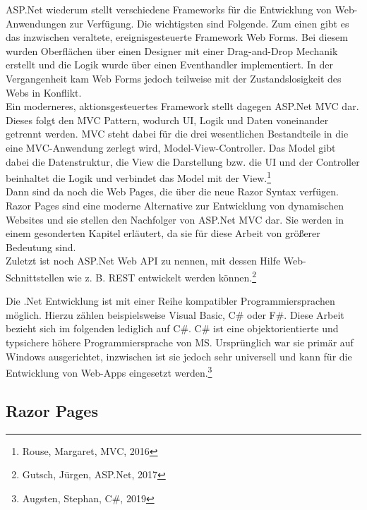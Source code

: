 \documentclass[a4paper,
12pt,
oneside]
{article}
\newcommand{\sPar}{\par\vspace*{6pt}}
\begin{document}
	ASP.Net wiederum stellt verschiedene Frameworks für die Entwicklung von Web-Anwendungen zur Verfügung. Die wichtigsten sind Folgende. Zum einen gibt es das inzwischen veraltete, ereignisgesteuerte Framework \glqq Web Forms\grqq. Bei diesem wurden Oberflächen über einen Designer mit einer Drag-and-Drop Mechanik erstellt und die Logik wurde über einen Eventhandler implementiert. In der Vergangenheit kam Web Forms jedoch teilweise mit der Zustandslosigkeit des Webs in Konflikt. \\
	Ein moderneres, aktionsgesteuertes Framework stellt dagegen ASP.Net MVC dar. Dieses folgt den MVC Pattern, wodurch UI, Logik und Daten voneinander getrennt werden. MVC steht dabei für die drei wesentlichen Bestandteile in die eine MVC-Anwendung zerlegt wird, \glqq Model-View-Controller\grqq. Das Model gibt dabei die Datenstruktur, die View die Darstellung bzw. die UI und der Controller beinhaltet die Logik und verbindet das Model mit der View.\footnote{Rouse, Margaret, MVC, 2016} \\
	Dann sind da noch die Web Pages, die über die neue Razor Syntax verfügen. Razor Pages sind eine moderne Alternative zur Entwicklung von dynamischen Websites und sie stellen den Nachfolger von ASP.Net MVC dar. Sie werden in einem gesonderten Kapitel erläutert, da sie für diese Arbeit von größerer Bedeutung sind. \\
	Zuletzt ist noch ASP.Net Web API zu nennen, mit dessen Hilfe Web-Schnittstellen wie z. B. REST entwickelt werden können.\footnote{Gutsch, Jürgen, ASP.Net, 2017} \sPar
	Die .Net Entwicklung ist mit einer Reihe kompatibler Programmiersprachen möglich. Hierzu zählen beispielsweise Visual Basic, C\# oder F\#. Diese Arbeit bezieht sich im folgenden lediglich auf C\#. C\# ist eine objektorientierte und typsichere höhere Programmiersprache von MS. Ursprünglich war sie primär auf Windows ausgerichtet, inzwischen ist sie jedoch sehr universell und kann für die Entwicklung von Web-Apps eingesetzt werden.\footnote{Augsten, Stephan, C\#, 2019}
	
	\subsection{Razor Pages}
	
\end{document}
